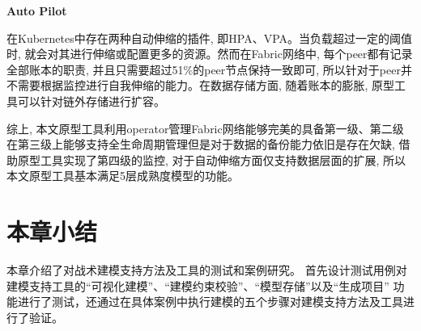 \textbf{Auto Pilot}

在Kubernetes中存在两种自动伸缩的插件, 即HPA、VPA。当负载超过一定的阈值时, 就会对其进行伸缩或配置更多的资源。然而在Fabric网络中, 每个peer都有记录全部账本的职责, 并且只需要超过51\%的peer节点保持一致即可, 所以针对于peer并不需要根据监控进行自我伸缩的能力。在数据存储方面, 随着账本的膨胀, 原型工具可以针对链外存储进行扩容。

综上, 本文原型工具利用operator管理Fabric网络能够完美的具备第一级、第二级在第三级上能够支持全生命周期管理但是对于数据的备份能力依旧是存在欠缺, 借助原型工具实现了第四级的监控, 对于自动伸缩方面仅支持数据层面的扩展, 所以本文原型工具基本满足5层成熟度模型的功能。



\section{本章小结}

本章介绍了对战术建模支持方法及工具的测试和案例研究。
首先设计测试用例对建模支持工具的“可视化建模”、“建模约束校验”、“模型存储”以及“生成项目”
功能进行了测试，还通过在具体案例中执行建模的五个步骤对建模支持方法及工具进行了验证。
